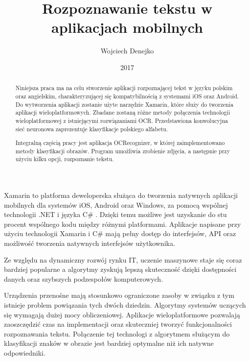 \documentclass[brudnopis]{xmgr}
\author   {Wojciech Denejko}
\title    {Rozpoznawanie tekstu w aplikacjach mobilnych}
\date     {2017}
\begin{document}
\begin{abstract}
  Niniejsza praca ma na celu stworzenie aplikacji rozpoznającej tekst w języku polskim oraz angielskim, charakteryzującej się kompatybilnością z systemami iOS oraz Android. Do wytworzenia aplikacji zostanie użyte narzędzie Xamarin, które służy do tworzenia aplikacji wieloplatformowych. Zbadane zostaną różne metody połączenia technologii wieloplatformowej z istniejącymi rozwiązaniami OCR. Przedstawiona konwolucyjna sieć neuronowa zaprezentuje klasyfikacje polskiego alfabetu.
  
  Integralną częścią pracy jest aplikacja OCRecognizer, w której zaimplementowano metody klasyfikacji obrazów. Program umożliwia zrobienie zdjęcia, a następnie przy użyciu kilku opcji, rozpoznanie tekstu.
  
\end{abstract}


\maketitle

\introduction

	Xamarin to platforma deweloperska służąca do tworzenia natywnych aplikacji mobilnych dla systemów iOS, Android oraz Windows, za pomocą wspólnej technologii .NET i języka C\# . Dzięki temu możliwe jest uzyskanie do stu procent wspólnego kodu między różnymi platformami. Aplikacje napisane przy użyciu technologii Xamarin i C\# mają pełny dostęp do interfejsów, API oraz możliwość tworzenia natywnych interfejsów użytkownika.
  
  Ze względu na dynamiczny rozwój rynku IT, uczenie maszynowe staje się coraz bardziej popularne a algorytmy zyskują lepszą skuteczność dzięki dostępności danych oraz szybszych podzespołów komputerowych. 
  
  Urządzenia przenośne mają stosunkowo ograniczone zasoby w związku z tym istnieje problem powiązania tych dwóch dziedzin. Algorytmy systemów uczących się wymagają dużej mocy obliczeniowej. Aplikacje wieloplatformowe pozwalają zaoszczędzić czas na implementacji oraz skuteczniej tworzyć funkcjonalności rozpoznawania tekstu. Połączenie tej technologi z algorytmem służącym do klasyfikacji znaków w obrazie jest bardziej optymalne niż ich natywne odpowiedniki.
  
\end{document}
